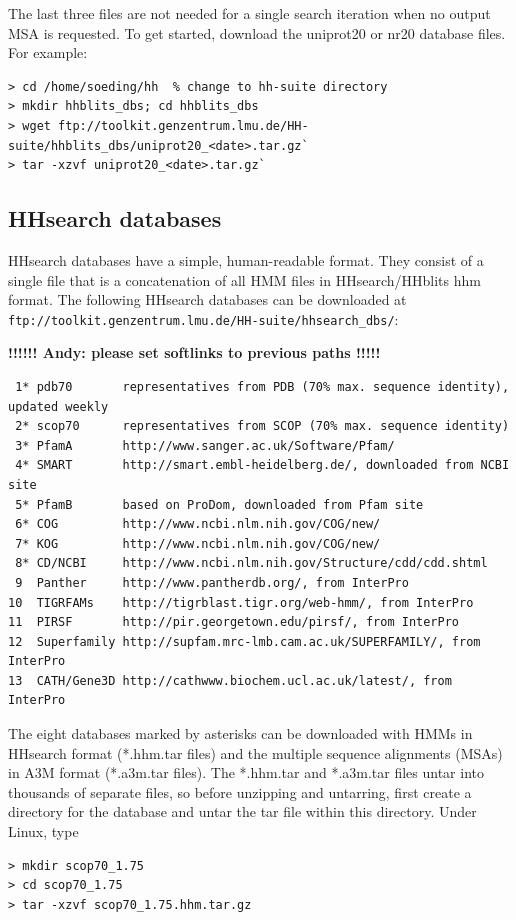 \documentclass[11pt,a4paper]{article}
\begin{document}
The last three files are not needed for a single search iteration when no output MSA is requested. To get started, download the uniprot20 or nr20 database files. For example:

\begin{verbatim}
> cd /home/soeding/hh  % change to hh-suite directory
> mkdir hhblits_dbs; cd hhblits_dbs
> wget ftp://toolkit.genzentrum.lmu.de/HH-suite/hhblits_dbs/uniprot20_<date>.tar.gz`
> tar -xzvf uniprot20_<date>.tar.gz`
\end{verbatim}

\subsection{HHsearch databases} \label{hhsearch_dbs}
HHsearch databases have a simple, human-readable format. They consist of a single file that is a concatenation of all HMM files in HHsearch/HHblits hhm format. The following HHsearch databases can be downloaded at
\verb`ftp://toolkit.genzentrum.lmu.de/HH-suite/hhsearch_dbs/`: 

{\bf !!!!!! Andy: please set softlinks to previous paths !!!!!}

\small 
\begin{verbatim}
 1* pdb70       representatives from PDB (70% max. sequence identity), updated weekly
 2* scop70      representatives from SCOP (70% max. sequence identity)
 3* PfamA       http://www.sanger.ac.uk/Software/Pfam/
 4* SMART       http://smart.embl-heidelberg.de/, downloaded from NCBI site
 5* PfamB       based on ProDom, downloaded from Pfam site
 6* COG         http://www.ncbi.nlm.nih.gov/COG/new/
 7* KOG	        http://www.ncbi.nlm.nih.gov/COG/new/
 8* CD/NCBI     http://www.ncbi.nlm.nih.gov/Structure/cdd/cdd.shtml
 9  Panther     http://www.pantherdb.org/, from InterPro
10  TIGRFAMs    http://tigrblast.tigr.org/web-hmm/, from InterPro
11  PIRSF       http://pir.georgetown.edu/pirsf/, from InterPro
12  Superfamily http://supfam.mrc-lmb.cam.ac.uk/SUPERFAMILY/, from InterPro
13  CATH/Gene3D http://cathwww.biochem.ucl.ac.uk/latest/, from InterPro 
\end{verbatim} 
\normalsize

The eight databases marked by asterisks can be downloaded with HMMs in HHsearch 
format (*.hhm.tar files) and the multiple sequence alignments (MSAs) in 
A3M format (*.a3m.tar files).  The *.hhm.tar and *.a3m.tar files untar into thousands
of separate files, so before unzipping and untarring, first create a directory for 
the database and untar the tar file within this directory. Under Linux, type
\begin{verbatim}
> mkdir scop70_1.75
> cd scop70_1.75
> tar -xzvf scop70_1.75.hhm.tar.gz
\end{verbatim}
\end{document}
